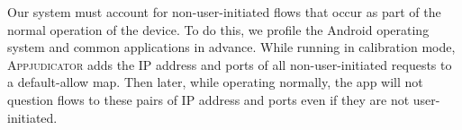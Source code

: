 Our system must account for non-user-initiated flows that occur as part of the
normal operation of the device. To do this, we profile the Android operating
system and common applications in advance.  While running in calibration mode,
\textsc{Appjudicator} adds the IP address and ports of all non-user-initiated
requests to a default-allow map. Then later, while operating normally, the app
will not question flows to these pairs of IP address and ports even if they are
not user-initiated.



\newpage

